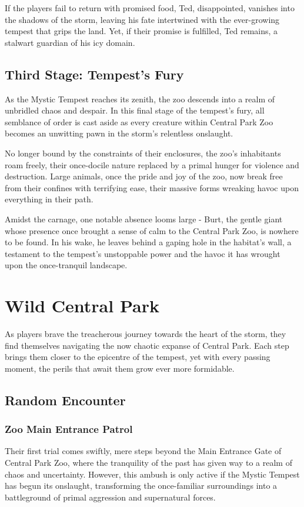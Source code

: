 If the players fail to return with promised food, Ted, disappointed, vanishes into the shadows of the storm, leaving his fate intertwined with the ever-growing tempest that grips the land. Yet, if their promise is fulfilled, Ted remains, a stalwart guardian of his icy domain.

\subsection*{Third Stage: Tempest's Fury}
As the Mystic Tempest reaches its zenith, the zoo descends into a realm of unbridled chaos and despair. In this final stage of the tempest's fury, all semblance of order is cast aside as every creature within Central Park Zoo becomes an unwitting pawn in the storm's relentless onslaught.

No longer bound by the constraints of their enclosures, the zoo's inhabitants roam freely, their once-docile nature replaced by a primal hunger for violence and destruction. Large animals, once the pride and joy of the zoo, now break free from their confines with terrifying ease, their massive forms wreaking havoc upon everything in their path.\\\hfill\eject

Amidst the carnage, one notable absence looms large - Burt, the gentle giant whose presence once brought a sense of calm to the Central Park Zoo, is nowhere to be found. In his wake, he leaves behind a gaping hole in the habitat's wall, a testament to the tempest's unstoppable power and the havoc it has wrought upon the once-tranquil landscape.

\section*{Wild Central Park}
As players brave the treacherous journey towards the heart of the storm, they find themselves navigating the now chaotic expanse of Central Park. Each step brings them closer to the epicentre of the tempest, yet with every passing moment, the perils that await them grow ever more formidable.

\subsection*{Random Encounter}
\subsubsection*{Zoo Main Entrance Patrol}
Their first trial comes swiftly, mere steps beyond the Main Entrance Gate of Central Park Zoo, where the tranquility of the past has given way to a realm of chaos and uncertainty. However, this ambush is only active if the Mystic Tempest has begun its onslaught, transforming the once-familiar surroundings into a battleground of primal aggression and supernatural forces.

